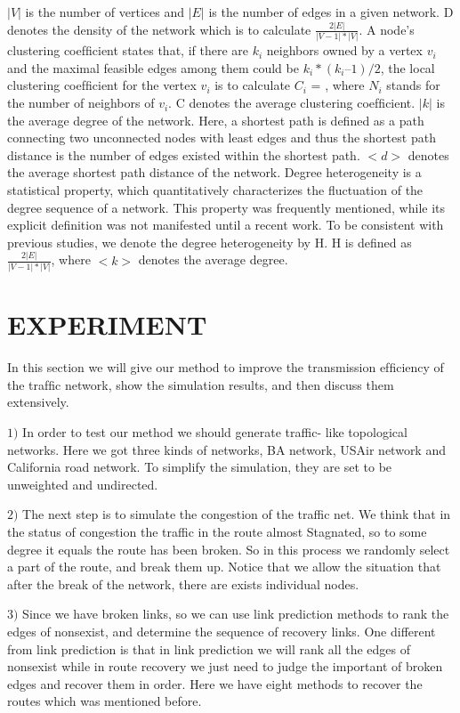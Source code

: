 \documentclass[onecolumn,preprintnumbers,amsmath,amssymb]{revtex4}
\begin{document}
$|V|$ is the number of vertices and $|E|$ is the number of edges in a given network. D denotes the density of the network which is to calculate $\frac{2|E|}{|V-1|*|V|}$. A node’s clustering coefﬁcient states that, if there are $k_i$ neighbors owned by a vertex $v_i$ and the maximal feasible edges among them could be $k_i*(k_i – 1)/2$, the local clustering coefﬁcient for the vertex $v_i$ is to calculate $C_i$ = \cite{SW}, where $N_i$ stands for the number of neighbors of $v_i$. C denotes the average clustering coefﬁcient. $|k|$ is the average degree of the network. Here, a shortest path is deﬁned as a path connecting two unconnected nodes with least edges and thus the shortest path distance is the number of edges existed within the shortest path. $<d>$ denotes the average shortest path distance of the network. Degree heterogeneity is a statistical property, which quantitatively characterizes the fluctuation of the degree sequence of a network. This property was frequently mentioned, while its explicit definition was not manifested until a recent work\cite{PML}. To be consistent with previous studies, we denote the degree heterogeneity by H. H is defined as $\frac{2|E|}{|V-1|*|V|}$, where $<k>$ denotes the average degree\cite{KD}.



\section*{EXPERIMENT\protect}

In this section we will give our method to improve the transmission efﬁciency of the  trafﬁc network, show the simulation results, and then discuss them extensively.


$1)$ In order to test our method we should generate traffic- like topological networks. Here we got three kinds of networks, BA network, USAir network and California road network. To simplify the simulation, they are set to be unweighted and undirected.

$2)$ The next step is to simulate the congestion of the traffic net. We think that in the status of congestion the traffic in the route almost Stagnated, so to some degree it equals the route has been broken. So in this process we randomly select a part of the route, and break them up. Notice that we allow the situation that after the break of the network, there are exists individual nodes.

$3)$ Since we have broken links, so we can use link prediction methods to rank the edges of nonsexist, and determine the sequence of recovery links. One different from link prediction is that in link prediction we will rank all the edges of nonsexist while in route recovery we just need to judge the important of broken edges and recover them in order. Here we have eight methods to recover the routes which was mentioned before. 
\end{document}
